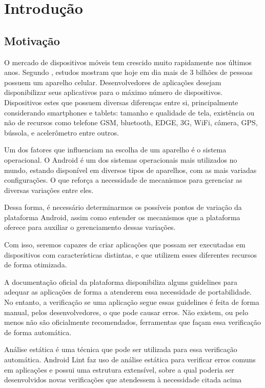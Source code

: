 \chapter{Introdução}

\section{Motivação}
O mercado de dispositivos móveis tem crescido muito rapidamente nos últimos anos.
Segundo \cite{lecheta}, estudos mostram que hoje em dia mais de 3 bilhões de pessoas
possuem um aparelho celular. Desenvolvedores de aplicações desejam disponibilizar
seus aplicativos para o máximo número de dispositivos. Dispositivos estes que
possuem diversas diferenças entre si, principalmente considerando smartphones e
tablets: tamanho e qualidade de tela, existência ou não de recursos como telefone
GSM, bluetooth, EDGE, 3G, WiFi, câmera, GPS, bússola, e acelerômetro entre outros.

Um dos fatores que influenciam na escolha de um aparelho é o sistema operacional.
O Android é um dos sistemas operacionais mais utilizados no mundo, estando 
disponível em diversos tipos de aparelhos, com as mais variadas configurações.
O que reforça a necessidade de mecanismos para gerenciar as diversas variações entre 
eles.

Dessa forma, é necessário determinarmos os possíveis pontos de variação da plataforma
Android, assim como entender os mecanismos que a plataforma oferece para auxiliar
o gerenciamento dessas variações. 

Com isso, seremos capazes de criar aplicações que possam ser executadas em dispositivos
com características distintas, e que utilizem esses diferentes recursos de forma otimizada.

A documentação oficial da plataforma disponibiliza alguns guidelines para adequar
as aplicações de forma a atenderem essa necessidade de portabilidade. No entanto, 
a verificação se uma aplicação segue essas guidelines é feita de forma manual, pelos
desenvolvedores, o que pode causar erros. Não existem, ou pelo menos não são
oficialmente recomendados, ferramentas que façam essa verificação de forma automática.

Análise estática é uma técnica que pode ser utilizada para essa
verificação automática. Android Lint faz uso de análise estática para verificar
erros comuns em aplicações e possui uma estrutura extensível, sobre a qual poderia
ser desenvolvidos novas verificações que atendessem à necessidade citada acima

